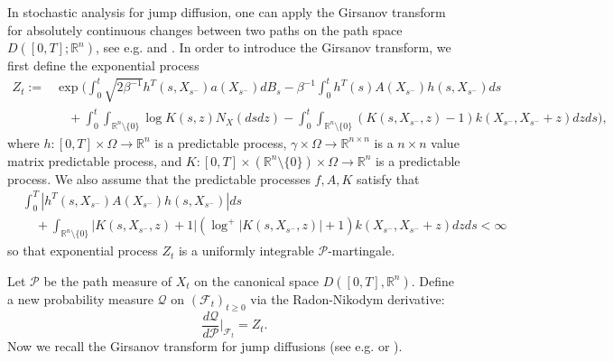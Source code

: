 \documentclass[10pt]{article}
\theoremstyle{definition}
\theoremstyle{remark}
\numberwithin{equation}{section}
\begin{document}
In stochastic analysis for jump diffusion, one can apply the Girsanov transform for absolutely continuous changes between two paths on the path space $D([0,T];\mathbb{R}^n)$, see e.g. \cite[Theorem 33.2]{S99} and \cite[Theorem 2.4]{FK21}.
In order to introduce the Girsanov transform, we first define the exponential process 
\begin{align*}
    Z_t:= & \exp\bigg( \int_0^t \sqrt{2\beta^{-1}} h^T(s,X_{s^-})a(X_{s^-}) dB_s -  \beta^{-1}\int_0^t h^T(s) A(X_{s^-}) h(s,X_{s^-}) ds \nonumber \\
    & \quad  + \int_0^t \int_{\mathbb{R}^n\setminus\{0\}} \log K(s, z) N_X(ds dz) - \int_0^t \int_{\mathbb{R}^n\setminus\{0\}} (K(s,X_{s^-},z)-1) k(X_{s^-}, X_{s^-}+z)dz ds \bigg),
\end{align*}
where $h: [0,T]\times \Omega \rightarrow \mathbb{R}^n$ is a predictable process, $\gamma \times \Omega \rightarrow \mathbb{R}^{n \times n}$ is a $n\times n$ value matrix predictable process, and $K: [0,T] \times (\mathbb{R}^n \setminus\{0\}) \times \Omega \rightarrow \mathbb{R}^n$ is a predictable process.
We also assume that the predictable processes $f, A, K$ satisfy that
\begin{align}\label{ConD}
    &\int^T_0 |h^{T}(s,X_{s^-})A(X_{s^-}) h(s,X_{s^-})|ds \nonumber \\
    & \quad +  \int_{\mathbb{R}^n\setminus\{0\}} |K(s,X_{s^-},z) +1|(\log^{+} |K(s,X_{s^-},z)|+1) k(X_{s^-}, X_{s^-}+z)dz ds < \infty
\end{align}
so that exponential process $Z_t$ is a uniformly integrable $\mathcal{P}$-martingale.

Let $\mathcal{P}$ be the path measure of $X_t$ on the canonical space $D([0,T],\mathbb{R}^n)$. 
Define a new probability measure $\mathcal{Q}$ on $(\mathscr{F}_t)_{t \geq 0}$ via the Radon-Nikodym derivative:
\begin{equation*}
     \frac{d\mathcal{Q}}{d\mathcal{P}} \bigg|_{\mathscr{F}_t} = Z_t.
\end{equation*}
Now we recall the Girsanov transform for jump diffusions (see e.g. \cite[Theorem 33.2]{S99} or \cite[Theorem 2.4]{FK21}).
\end{document}
